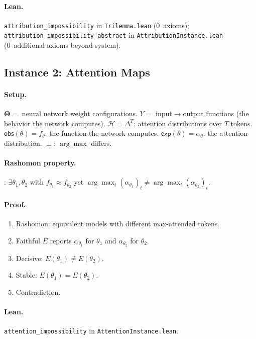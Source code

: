 \documentclass[11pt,a4paper]{article}
\newcommand{\Params}{\mathbf{\Theta}}
\newcommand{\sH}{\mathcal{H}}
\newcommand{\incomp}{\perp}
\begin{document}
\paragraph{Lean.}
{\raggedright
\texttt{attribution\_impossibility} in \texttt{Trilemma.lean}
(0~axioms);
\texttt{attribution\_impossibility\_abstract} in
\texttt{AttributionInstance.lean}
(0~additional axioms beyond system).\par}

\subsection{Instance 2: Attention Maps}
\label{app:proof-attention}

\paragraph{Setup.}
$\Params ={}$ neural network weight configurations.
$Y ={}$ input$\to$output functions (the behavior the network computes).
$\sH = \Delta^T$: attention distributions over $T$ tokens.
$\mathsf{obs}(\theta) = f_\theta$: the function the network computes.
$\mathsf{exp}(\theta) = \alpha_\theta$: the attention distribution.
$\incomp$: $\arg\max$ differs.

\paragraph{Rashomon property.}
\citet{damour2022underspecification}: $\exists \theta_1, \theta_2$ with
$f_{\theta_1} \approx f_{\theta_2}$ yet
$\arg\max_t (\alpha_{\theta_1})_t \neq \arg\max_t (\alpha_{\theta_2})_t$.

\paragraph{Proof.}
\begin{enumerate}[nosep]
  \item Rashomon: equivalent models with different max-attended tokens.
  \item Faithful $E$ reports $\alpha_{\theta_1}$ for $\theta_1$ and
    $\alpha_{\theta_2}$ for $\theta_2$.
  \item Decisive: $E(\theta_1) \neq E(\theta_2)$.
  \item Stable: $E(\theta_1) = E(\theta_2)$.
  \item Contradiction.
\end{enumerate}

\paragraph{Lean.}
\texttt{attention\_impossibility} in \texttt{AttentionInstance.lean}.
\end{document}
